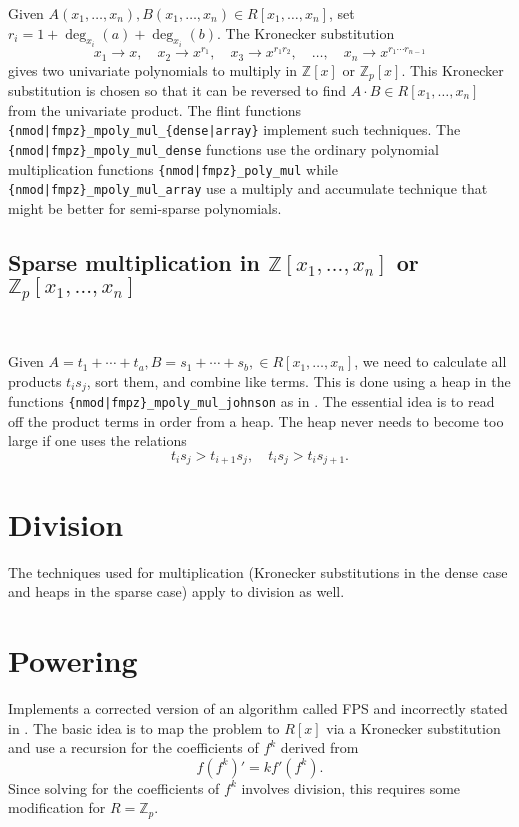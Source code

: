 \documentclass[12pt,reqno]{amsart}
\numberwithin{equation}{section}
\newcommand{\op}[1]  { \operatorname{ #1 }}
\newcommand{\bbZ}[0]  { \mathbb{Z}}
\begin{document}
Given $A(x_1,\dots,x_n), B(x_1,\dots,x_n) \in R[x_1,\dots,x_n]$, set $r_i = 1 + \op{deg}_{x_i}(a) + \op{deg}_{x_i}(b)$. The Kronecker substitution
\begin{equation*}
x_1 \to x, \quad x_2 \to x^{r_1}, \quad x_3 \to x^{r_1 r_2}, \quad \dots, \quad x_n \to x^{r_1 \cdots r_{n-1}}
\end{equation*}
gives two univariate polynomials to multiply in $\bbZ[x]$ or $\bbZ_p[x]$. This Kronecker substitution is chosen so that it can be reversed to find $A \cdot B \in R[x_1,\dots,x_n]$ from the univariate product. The flint functions {\tt \{nmod|fmpz\}\_mpoly\_mul\_\{dense|array\}} implement such techniques. The {\tt \{nmod|fmpz\}\_mpoly\_mul\_dense} functions use the ordinary polynomial multiplication functions {\tt \{nmod|fmpz\}\_poly\_mul} while {\tt \{nmod|fmpz\}\_mpoly\_mul\_array} use a multiply and accumulate technique that might be better for semi-sparse polynomials.


\subsection{Sparse multiplication in $\bbZ[x_1,\dots,x_n]$ or $\bbZ_p[x_1,\dots,x_n]$}\

Given $A = t_1 + \cdots + t_a, B = s_1 + \cdots + s_b, \in R[x_1,\dots,x_n]$, we need to calculate all products $t_i s_j$, sort them, and combine like terms. This is done using a heap in the functions {\tt \{nmod|fmpz\}\_mpoly\_mul\_johnson} as in \cite{Johnson}. The essential idea is to read off the product terms in order from a heap. The heap never needs to become too large if one uses the relations
\begin{equation*}
t_i s_j > t_{i+1} s_j, \quad t_i s_j > t_i s_{j+1}\text{.}
\end{equation*}


\section{Division}

The techniques used for multiplication (Kronecker substitutions in the dense case and heaps in the sparse case) apply to division as well.


\section{Powering}

Implements a corrected version of an algorithm called FPS and incorrectly stated in \cite{FPS}. The basic idea is to map the problem to $R[x]$ via a Kronecker substitution and use a recursion for the coefficients of $f^k$ derived from
\begin{equation*}
f (f^k)' = k f' (f^k)\text{.}
\end{equation*}
Since solving for the coefficients of $f^k$ involves division, this requires some modification for $R=\bbZ_p$.
\end{document}
